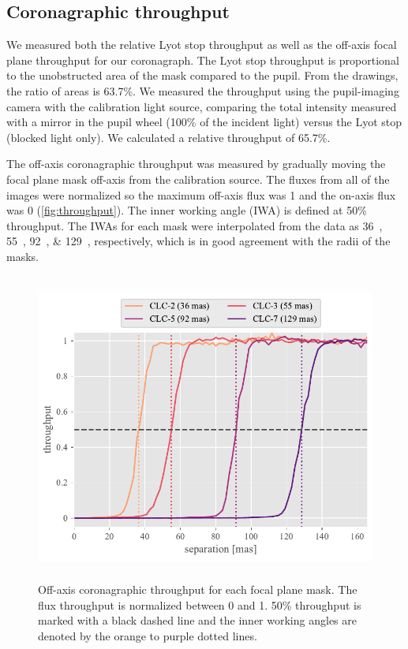 \documentclass[]{spie}  %
\begin{document}
\subsection{Coronagraphic throughput}

We measured both the relative Lyot stop throughput as well as the off-axis focal plane throughput for our coronagraph. The Lyot stop throughput is proportional to the unobstructed area of the mask compared to the pupil. From the drawings, the ratio of areas is 63.7\%. We measured the throughput using the pupil-imaging camera with the calibration light source, comparing the total intensity measured with a mirror in the pupil wheel (100\% of the incident light) versus the Lyot stop (blocked light only). We calculated a relative throughput of 65.7\%.

The off-axis coronagraphic throughput was measured by gradually moving the focal plane mask off-axis from the calibration source. The fluxes from all of the images were normalized so the maximum off-axis flux was 1 and the on-axis flux was 0 (\autoref{fig:throughput}). The inner working angle (IWA) is defined at 50\% throughput. The IWAs for each mask were interpolated from the data as \qtylist{36;55;92;129}{\milliarcsecond}, respectively, which is in good agreement with the radii of the masks.


\begin{figure}
   \centering
   \includegraphics[height=4in]{figures/throughput_curves}
   \caption{Off-axis coronagraphic throughput for each focal plane mask. The flux throughput is normalized between 0 and 1. 50\% throughput is marked with a black dashed line and the inner working angles are denoted by the orange to purple dotted lines.}\label{fig:throughput}
\end{figure}
\end{document}
